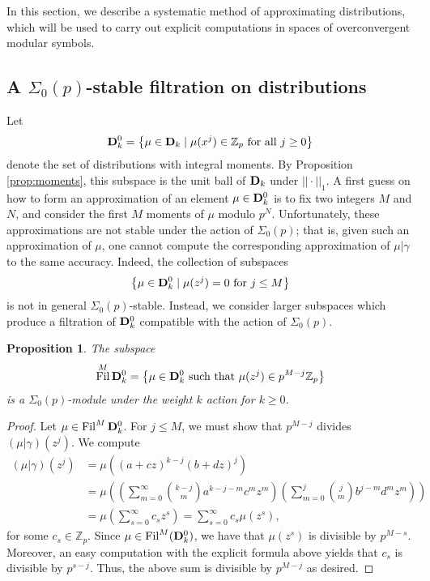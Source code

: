 \documentclass{amsart}
\theoremstyle{plain}
\newtheorem{prop}[thm]{Proposition}
\theoremstyle{definition}
\newcommand{\bD}{{\bf D}}
\newcommand{\Z}{{\mathbb Z}}
\newcommand{\Zp}{\Z_p}
\newcommand{\sigop}{\Sigma_0(p)}
\renewcommand{\binom}[2]{\genfrac{(}{)}{0pt}{}{#1}{#2}}
\newcommand{\Dvrig}[1]{\bD_{#1}}
\newcommand{\Dkrig}{\Dvrig{k}}
\DeclareMathOperator{\Fil}{Fil}
\begin{document}
In this section, we describe a systematic method of approximating distributions, which will be used to carry out explicit computations in spaces of overconvergent modular symbols.

\subsection{A $\sigop$-stable filtration on distributions}
\label{sec:filt}

Let 
$$
\Dkrig^0 = \left\{  \mu \in \Dkrig \mid
\mu(x^j) \in \Zp \text{~for~all~} j\geq 0
\right\}
$$
denote the set of distributions with integral moments. By Proposition \ref{prop:moments}, this subspace is the unit ball of $\Dkrig$ under $||\cdot ||_1$.  A first guess on how to form an approximation of an element $\mu \in \Dkrig^0$ is to fix two integers $M$ and $N$, and consider the first $M$ moments of $\mu$ modulo $p^N$. Unfortunately, these approximations are not stable under the action of $\sigop$; that is, given such an approximation of $\mu$, one cannot compute the corresponding approximation of $\mu \big| \gamma$ to the same accuracy.  Indeed,  the collection of subspaces
$$
\left\{ \mu \in \Dkrig^0 \mid \mu(z^j) = 0 \text{~for~} j \leq M
\right\}
$$
is not in general $\sigop$-stable.
Instead, we consider larger subspaces which produce a filtration of $\Dkrig^0$ compatible with the action of $\sigop$.  

\begin{prop}
\label{prop:filt}
The subspace
$$
\Fil^M \Dkrig^0 = \left\{  \mu \in \Dkrig^0 \text{~such~that~} \mu(z^j) \in p^{M-j} \Zp \right\}
$$
is a $\sigop$-module under the weight $k$ action for $k \geq 0$.
\end{prop}

\begin{proof}
Let $\mu \in \Fil^M \Dkrig^0$.   For $j \leq M$, we must show that $p^{M-j}$ divides $(\mu \big| \gamma)(z^j)$.  We compute
\begin{align*}
(\mu \big| \gamma)(z^j) &= \mu \left( (a+cz)^{k-j} (b+dz)^j\right) \\
&= \mu \left( \left( \sum_{m=0}^\infty \binom{k-j}{m} a^{k-j-m} c^m z^m
\right)
\left( \sum_{m=0}^j \binom{j}{m} b^{j-m} d^m z^m \right) \right) \\
&= \mu \left( \sum_{s=0}^\infty c_s z^s \right) 
=  \sum_{s=0}^\infty c_s \mu(z^s),
\end{align*}
for some $c_s \in \Zp$.  Since $\mu \in \Fil^M(\Dkrig^0)$, we have that $\mu(z^s)$ is divisible by $p^{M-s}$.  Moreover, an easy computation with the explicit formula above yields that $c_s$ is divisible by $p^{s-j}$.  Thus, the above sum is divisible by $p^{M-j}$ as desired.
\end{proof}
\end{document}
